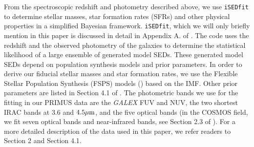 \documentclass{emulateapj}
\begin{document}
From the spectroscopic redshift and photometry described above, we use \texttt{iSEDfit} to determine stellar masses, star formation rates (SFRs) and other physical properties
in a simplified Bayesian framework.
\texttt{iSEDfit}, which we will only briefly mention in this paper is discussed in detail in Appendix A. of \cite{Moustakas:2013aa}.
The code uses the redshift and the observed photometry of the galaxies to determine the statistical likelihood of a large ensemble of generated model SEDs. 
These generated model SEDs depend on population synthesis models and prior parameters.
In order to derive our fiducial stellar masses and star formation rates, we use the Flexible Stellar Population Synthesis (FSPS) models (\cite{Conroy:2010aa}) based on the \cite{Chabrier:2003aa} IMF. 
Other prior parameters are listed in Section 4.1 of \cite{Moustakas:2013aa}. 
The photometric bands we use for the fitting in our PRIMUS data are the {\em GALEX} FUV and NUV, the two shortest IRAC bands at $3.6$ and $4.5 \mu \rm{m}$, and the five optical bands
(in the COSMOS field, we fit seven optical bands and near-infrared bands, see Section 2.3 of \cite{Moustakas:2013aa}).
For a more detailed description of the data used in this paper, we refer readers to \cite{Moustakas:2013aa} Section 2 and Section 4.1.
\end{document}
